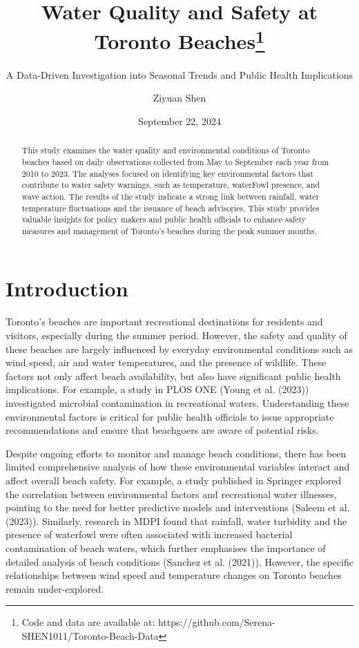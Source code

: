 \documentclass[
  letterpaper,
  DIV=11,
  numbers=noendperiod]{scrartcl}
\title{Water Quality and Safety at Toronto Beaches\thanks{Code and data
are available at:
https://github.com/Serena-SHEN1011/Toronto-Beach-Data}}
\subtitle{A Data-Driven Investigation into Seasonal Trends and Public
Health Implications}
\author{Ziyuan Shen}
\date{September 22, 2024}
\renewcommand*\contentsname{Table of contents}
\newcommand\contentsname{Table of contents}
\begin{document}
\maketitle
\begin{abstract}
This study examines the water quality and environmental conditions of
Toronto beaches based on daily observations collected from May to
September each year from 2010 to 2023. The analyses focused on
identifying key environmental factors that contribute to water safety
warnings, such as temperature, waterFowl presence, and wave action. The
results of the study indicate a strong link between rainfall, water
temperature fluctuations and the issuance of beach advisories. This
study provides valuable insights for policy makers and public health
officials to enhance safety measures and management of Toronto's beaches
during the peak summer months.
\end{abstract}

\renewcommand*\contentsname{Table of contents}
{
\hypersetup{linkcolor=}
\setcounter{tocdepth}{3}
\tableofcontents
}

\section{Introduction}\label{introduction}

Toronto's beaches are important recreational destinations for residents
and visitors, especially during the summer period. However, the safety
and quality of these beaches are largely influenced by everyday
environmental conditions such as wind speed, air and water temperatures,
and the presence of wildlife. These factors not only affect beach
availability, but also have significant public health implications. For
example, a study in PLOS ONE (Young et al. (2023)) investigated
microbial contamination in recreational waters. Understanding these
environmental factors is critical for public health officials to issue
appropriate recommendations and ensure that beachgoers are aware of
potential risks.

Despite ongoing efforts to monitor and manage beach conditions, there
has been limited comprehensive analysis of how these environmental
variables interact and affect overall beach safety. For example, a study
published in Springer explored the correlation between environmental
factors and recreational water illnesses, pointing to the need for
better predictive models and interventions (Saleem et al. (2023)).
Similarly, research in MDPI found that rainfall, water turbidity and the
presence of waterfowl were often associated with increased bacterial
contamination of beach waters, which further emphasises the importance
of detailed analysis of beach conditions (Sanchez et al. (2021)).
However, the specific relationships between wind speed and temperature
changes on Toronto beaches remain under-explored.
\end{document}
